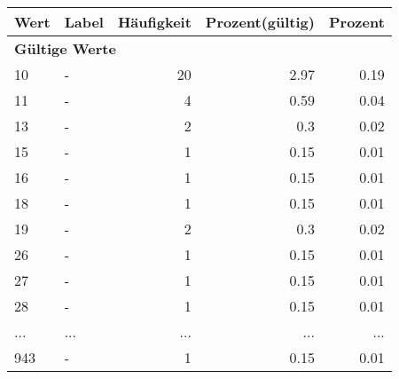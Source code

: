      \begin{longtable}{lXrrr}
     \toprule
     \textbf{Wert} & \textbf{Label} & \textbf{Häufigkeit} & \textbf{Prozent(gültig)} & \textbf{Prozent} \\
     \endhead
     \midrule
     \multicolumn{5}{l}{\textbf{Gültige Werte}}\\
        10 & \multicolumn{1}{X}{-} & %
          \num{20} &
          \num[round-mode=places,round-precision=2]{2,97} &
          \num[round-mode=places,round-precision=2]{0,19} \\
        11 & \multicolumn{1}{X}{-} & %
          \num{4} &
          \num[round-mode=places,round-precision=2]{0,59} &
          \num[round-mode=places,round-precision=2]{0,04} \\
        13 & \multicolumn{1}{X}{-} & %
          \num{2} &
          \num[round-mode=places,round-precision=2]{0,3} &
          \num[round-mode=places,round-precision=2]{0,02} \\
        15 & \multicolumn{1}{X}{-} & %
          \num{1} &
          \num[round-mode=places,round-precision=2]{0,15} &
          \num[round-mode=places,round-precision=2]{0,01} \\
        16 & \multicolumn{1}{X}{-} & %
          \num{1} &
          \num[round-mode=places,round-precision=2]{0,15} &
          \num[round-mode=places,round-precision=2]{0,01} \\
        18 & \multicolumn{1}{X}{-} & %
          \num{1} &
          \num[round-mode=places,round-precision=2]{0,15} &
          \num[round-mode=places,round-precision=2]{0,01} \\
        19 & \multicolumn{1}{X}{-} & %
          \num{2} &
          \num[round-mode=places,round-precision=2]{0,3} &
          \num[round-mode=places,round-precision=2]{0,02} \\
        26 & \multicolumn{1}{X}{-} & %
          \num{1} &
          \num[round-mode=places,round-precision=2]{0,15} &
          \num[round-mode=places,round-precision=2]{0,01} \\
        27 & \multicolumn{1}{X}{-} & %
          \num{1} &
          \num[round-mode=places,round-precision=2]{0,15} &
          \num[round-mode=places,round-precision=2]{0,01} \\
        28 & \multicolumn{1}{X}{-} & %
          \num{1} &
          \num[round-mode=places,round-precision=2]{0,15} &
          \num[round-mode=places,round-precision=2]{0,01} \\
       ... & ... & ... & ... & ... \\
        943 & \multicolumn{1}{X}{-} & %
          \num{1} &
          \num[round-mode=places,round-precision=2]{0,15} &
          \num[round-mode=places,round-precision=2]{0,01} \\


\end{longtable}
